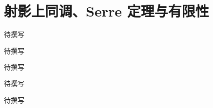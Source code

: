 
% 
% 

\chapter{射影上同调、Serre 定理与有限性}
\label{g5:ch:19}

\begin{chapterabstract}
待撰写
\end{chapterabstract}

\begin{learninggoals}
待撰写
\end{learninggoals}

待撰写







\begin{chaptersummary}
待撰写
\end{chaptersummary}

\BookExercises
待撰写

